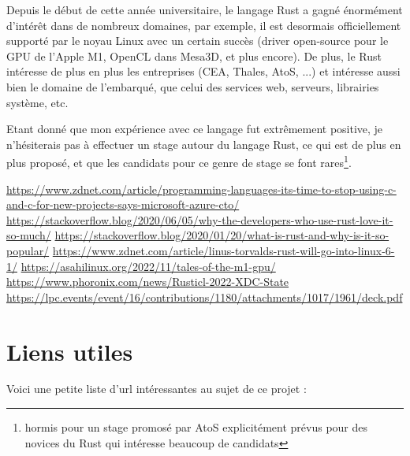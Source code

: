 \documentclass{EPUProjetDi}
\begin{document}
Depuis le début de cette année universitaire, le langage Rust a gagné énormément d'intérêt dans de nombreux domaines, par exemple, il est desormais officiellement supporté par le noyau Linux\cite{rustlinux} avec un certain succès (driver open-source pour le GPU de l'Apple M1\cite{asahi}, OpenCL dans Mesa3D\cite{rusticl}, et plus encore\cite{nvmerust}). De plus, le Rust intéresse de plus en plus les entreprises (CEA, Thales, AtoS, ...) et intéresse aussi bien le domaine de l'embarqué, que celui des services web, serveurs, librairies système, etc.

Etant donné que mon expérience avec ce langage fut extrêmement positive, je n'hésiterais pas à effectuer un stage autour du langage Rust, ce qui est de plus en plus proposé, et que les candidats pour ce genre de stage se font rares\footnote{hormis pour un stage promosé par AtoS explicitément prévus pour des novices du Rust qui intéresse beaucoup de candidats}.

\begin{thebibliography}{99}
\label{sec:biblio}
 \url{https://www.zdnet.com/article/programming-languages-its-time-to-stop-using-c-and-c-for-new-projects-says-microsoft-azure-cto/}
 \url{https://stackoverflow.blog/2020/06/05/why-the-developers-who-use-rust-love-it-so-much/}
 \url{https://stackoverflow.blog/2020/01/20/what-is-rust-and-why-is-it-so-popular/}
 \url{https://www.zdnet.com/article/linus-torvalds-rust-will-go-into-linux-6-1/}
 \url{https://asahilinux.org/2022/11/tales-of-the-m1-gpu/}
 \url{https://www.phoronix.com/news/Rusticl-2022-XDC-State}
 \url{https://lpc.events/event/16/contributions/1180/attachments/1017/1961/deck.pdf}
\end{thebibliography}


\appendix
{}


\chapter{Liens utiles\label{sec:liens_utiles}}
Voici une petite liste d'url intéressantes au sujet de ce projet :
\end{document}
